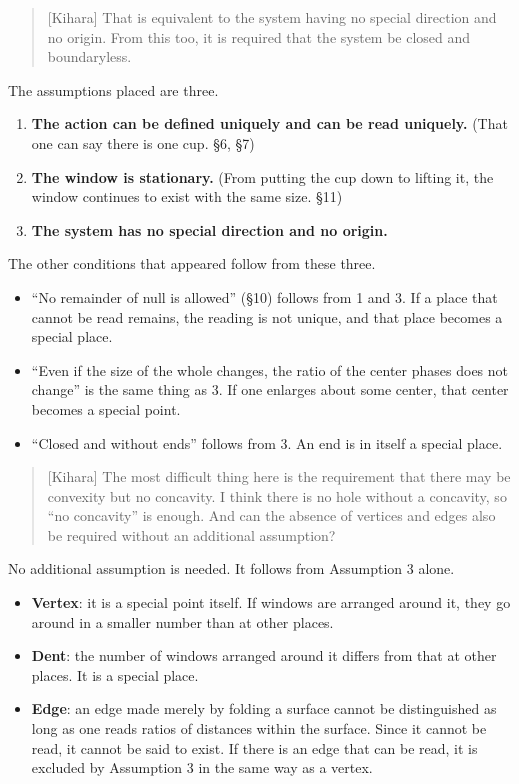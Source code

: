 \documentclass[
  a4paper,
]{article}
\providecommand{\tightlist}{%
  \setlength{\itemsep}{0pt}\setlength{\parskip}{0pt}}
\begin{document}
\begin{quote}
{[}Kihara{]} That is equivalent to the system having no special
direction and no origin. From this too, it is required that the system
be closed and boundaryless.
\end{quote}

The assumptions placed are three.

\begin{enumerate}
\def\labelenumi{\arabic{enumi}.}
\tightlist
\item
  \textbf{The action can be defined uniquely and can be read uniquely.}
  (That one can say there is one cup. §6, §7)
\item
  \textbf{The window is stationary.} (From putting the cup down to
  lifting it, the window continues to exist with the same size. §11)
\item
  \textbf{The system has no special direction and no origin.}
\end{enumerate}

The other conditions that appeared follow from these three.

\begin{itemize}
\tightlist
\item
  ``No remainder of null is allowed'' (§10) follows from 1 and 3. If a
  place that cannot be read remains, the reading is not unique, and that
  place becomes a special place.
\item
  ``Even if the size of the whole changes, the ratio of the center
  phases does not change'' is the same thing as 3. If one enlarges about
  some center, that center becomes a special point.
\item
  ``Closed and without ends'' follows from 3. An end is in itself a
  special place.
\end{itemize}

\begin{quote}
{[}Kihara{]} The most difficult thing here is the requirement that there
may be convexity but no concavity. I think there is no hole without a
concavity, so ``no concavity'' is enough. And can the absence of
vertices and edges also be required without an additional assumption?
\end{quote}

No additional assumption is needed. It follows from Assumption 3 alone.

\begin{itemize}
\tightlist
\item
  \textbf{Vertex}: it is a special point itself. If windows are arranged
  around it, they go around in a smaller number than at other places.
\item
  \textbf{Dent}: the number of windows arranged around it differs from
  that at other places. It is a special place.
\item
  \textbf{Edge}: an edge made merely by folding a surface cannot be
  distinguished as long as one reads ratios of distances within the
  surface. Since it cannot be read, it cannot be said to exist. If there
  is an edge that can be read, it is excluded by Assumption 3 in the
  same way as a vertex.
\end{itemize}
\end{document}
